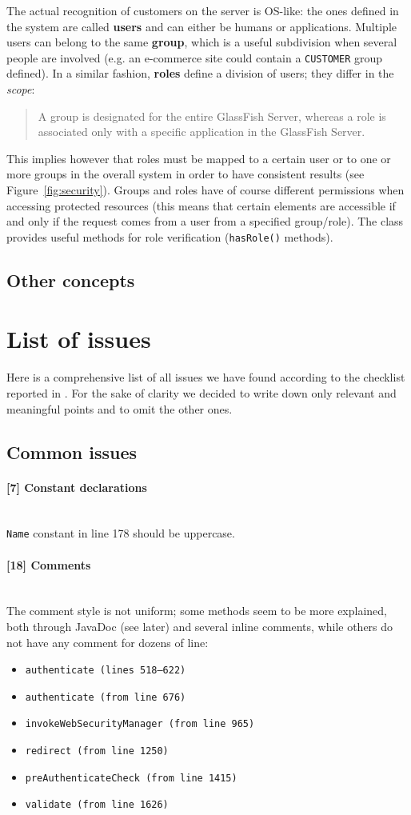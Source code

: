 \documentclass[a4paper, 11pt]{article}
\newcommand{\code}[1]{\texttt{#1}}
\newcommand{\issue}[3][?]{
    \paragraph{[#1] #2} \mbox{}\\ #3
}
\begin{document}
The actual recognition of customers on the server is OS-like: the ones defined in the system are called \textbf{users} and can either be humans or applications. Multiple users can belong to the same \textbf{group}, which is a useful subdivision when several people are involved (e.g. an e-commerce site could contain a \code{CUSTOMER} group defined). In a similar fashion, \textbf{roles} define a division of users; they differ in the \emph{scope}:
\begin{quote}
    A group is designated for the entire GlassFish Server, whereas a role is associated only with a specific application in the GlassFish Server.
\end{quote}
This implies however that roles must be mapped to a certain user or to one or more groups in the overall system in order to have consistent results (see Figure~\ref{fig:security}).
Groups and roles have of course different permissions when accessing protected resources (this means that certain elements are accessible if and only if the request comes from a user from a specified group/role). The class provides useful methods for role verification (\code{hasRole()} methods).


\subsection{Other concepts}


\newpage
\section{List of issues}

Here is a comprehensive list of all issues we have found according to the
checklist reported in \cite{bib:something}.
For the sake of clarity we decided to write down only relevant and 
meaningful points and to omit the other ones.

\subsection{Common issues} %
\issue[7]{Constant declarations}{
    \code{Name} constant in line 178 should be uppercase.
}

\issue[18]{Comments} {
The comment style is not uniform; some methods seem to be more explained, 
both through JavaDoc (see later) and several inline comments, while others 
do not have any comment for dozens of line:
\begin{itemize}
\item \code{authenticate (lines 518--622)} 
\item \code{authenticate (from line 676)} 
\item \code{invokeWebSecurityManager (from line 965)} 
\item \code{redirect (from line 1250)} 
\item \code{preAuthenticateCheck (from line 1415)} 
\item \code{validate (from line 1626)} 
\end{itemize}
}
\end{document}
